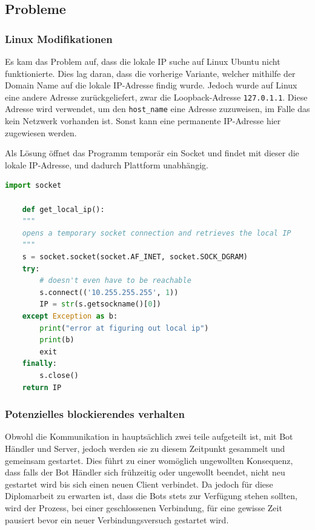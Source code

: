 
\subsection{Probleme}
\subsubsection{Linux Modifikationen}
Es kam das Problem auf, dass die lokale IP suche auf Linux Ubuntu nicht funktionierte.
Dies lag daran, dass die vorherige Variante, 
welcher mithilfe der Domain Name auf die lokale IP-Adresse findig wurde.
Jedoch wurde auf Linux eine andere Adresse zurückgeliefert, 
zwar die Loopback-Adresse \texttt{127.0.1.1}. 
Diese Adresse wird verwendet, um den \texttt{host\_name} eine Adresse zuzuweisen,
im Falle das kein Netzwerk vorhanden ist. 
Sonst kann eine permanente IP-Adresse hier zugewiesen werden.

Als Lösung öffnet das Programm temporär ein Socket 
und findet mit dieser die lokale IP-Adresse, und dadurch Plattform unabhängig.
\begin{lstlisting}[language=python, gobble=4]
    import socket

    def get_local_ip():
    """
    opens a temporary socket connection and retrieves the local IP
    """
    s = socket.socket(socket.AF_INET, socket.SOCK_DGRAM)
    try:
        # doesn't even have to be reachable
        s.connect(('10.255.255.255', 1))
        IP = str(s.getsockname()[0])
    except Exception as b:
        print("error at figuring out local ip")
        print(b)
        exit
    finally:
        s.close()
    return IP
\end{lstlisting}

\subsubsection{Potenzielles blockierendes verhalten}
Obwohl die Kommunikation in hauptsächlich zwei  teile aufgeteilt ist, mit 
Bot Händler und Server, 
jedoch werden sie zu diesem Zeitpunkt gesammelt und gemeinsam gestartet.
Dies führt zu einer womöglich ungewollten Konsequenz,
dass falls der Bot Händler sich frühzeitig oder ungewollt beendet, 
nicht neu gestartet wird bis sich einen neuen Client verbindet.
% 
Da jedoch für diese Diplomarbeit zu erwarten ist, 
dass die Bots stets zur Verfügung stehen sollten,
wird der Prozess, bei einer geschlossenen Verbindung,
für eine gewisse Zeit pausiert bevor ein neuer Verbindungsversuch gestartet wird.

